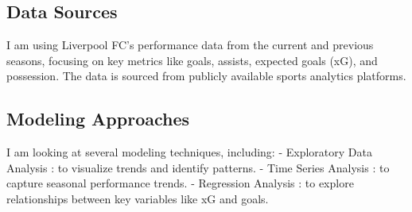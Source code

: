 \documentclass{article}
\begin{document}
\subsection*{Data Sources}
I am using Liverpool FC's performance data from the current and previous seasons, focusing on key metrics like goals, assists, expected goals (xG), and possession. The data is sourced from publicly available sports analytics platforms.

\subsection*{Modeling Approaches}
I am looking at several modeling techniques, including:
- Exploratory Data Analysis : to visualize trends and identify patterns.
- Time Series Analysis : to capture seasonal performance trends.
- Regression Analysis : to explore relationships between key variables like xG and goals.
\end{document}
